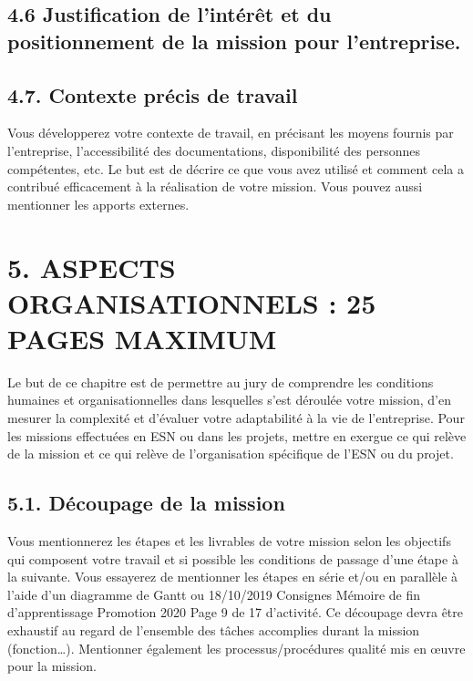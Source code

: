 \documentclass[a4paper, 12pt]{article}
\begin{document}
\subsection{4.6 Justification de l’intérêt et du positionnement de la mission pour l’entreprise.}

    
    \newpage{}

\subsection{4.7. Contexte précis de travail}

    
    \newpage{}

Vous développerez votre contexte de travail, en précisant les moyens fournis par l’entreprise,
l’accessibilité des documentations, disponibilité des personnes compétentes, etc. Le but est de décrire
ce que vous avez utilisé et comment cela a contribué efficacement à la réalisation de votre mission.
Vous pouvez aussi mentionner les apports externes.

\section{5. ASPECTS ORGANISATIONNELS : 25 PAGES MAXIMUM}

Le but de ce chapitre est de permettre au jury de comprendre les conditions humaines et
organisationnelles dans lesquelles s’est déroulée votre mission, d’en mesurer la complexité et
d’évaluer votre adaptabilité à la vie de l’entreprise.
Pour les missions effectuées en ESN ou dans les projets, mettre en exergue ce qui relève de la mission
et ce qui relève de l’organisation spécifique de l’ESN ou du projet.

\subsection{5.1. Découpage de la mission}

Vous mentionnerez les étapes et les livrables de votre mission selon les objectifs qui composent
votre travail et si possible les conditions de passage d’une étape à la suivante. Vous essayerez
de mentionner les étapes en série et/ou en parallèle à l’aide d’un diagramme de Gantt ou
18/10/2019 Consignes Mémoire de fin d'apprentissage Promotion 2020 Page 9 de 17
d’activité. Ce découpage devra être exhaustif au regard de l’ensemble des tâches accomplies
durant la mission (fonction…).
Mentionner également les processus/procédures qualité mis en œuvre pour la mission.
\end{document}
